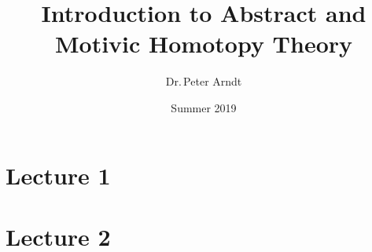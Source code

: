 \documentclass[twoside, a4paper]{report}
\title{Introduction to Abstract and Motivic Homotopy Theory}
\author{Dr.\,Peter Arndt}
\date{Summer 2019}
\begin{document}
\maketitle

\tableofcontents
\newpage

\chapter{Lecture 1}

% 

\chapter{Lecture 2}

\end{document}
